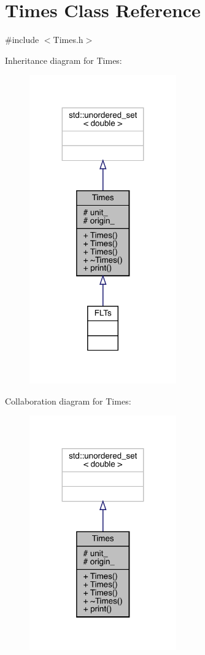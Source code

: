\hypertarget{class_times}{}\section{Times Class Reference}
\label{class_times}


{\ttfamily \#include $<$Times.\+h$>$}



Inheritance diagram for Times\+:
\nopagebreak
\begin{figure}[H]
\begin{center}
\leavevmode
\includegraphics[width=179pt]{class_times__inherit__graph}
\end{center}
\end{figure}


Collaboration diagram for Times\+:
\nopagebreak
\begin{figure}[H]
\begin{center}
\leavevmode
\includegraphics[width=179pt]{class_times__coll__graph}
\end{center}
\end{figure}
